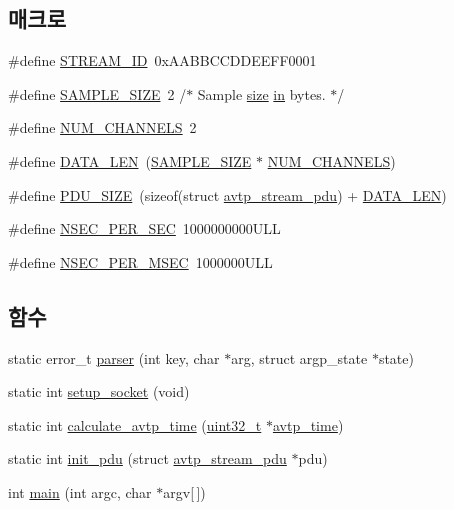 \subsection*{매크로}
\begin{DoxyCompactItemize}
\item 
\#define \hyperlink{aaf-talker_8c_ade86a80a3d067dece1f7e7cf957e3e92}{S\+T\+R\+E\+A\+M\+\_\+\+ID}~0x\+A\+A\+B\+B\+C\+C\+D\+D\+E\+E\+F\+F0001
\item 
\#define \hyperlink{aaf-talker_8c_ae25e0da7cdb20c758a56dc6aece92ba7}{S\+A\+M\+P\+L\+E\+\_\+\+S\+I\+ZE}~2 /$\ast$ Sample \hyperlink{gst__avb__playbin_8c_a439227feff9d7f55384e8780cfc2eb82}{size} \hyperlink{jack_8c_afc03a33132f7c0bcacbeeeaf5b8510c0}{in} bytes. $\ast$/
\item 
\#define \hyperlink{aaf-talker_8c_ae5597ce31d23d11493e6e674fe257d73}{N\+U\+M\+\_\+\+C\+H\+A\+N\+N\+E\+LS}~2
\item 
\#define \hyperlink{aaf-talker_8c_af02e45f15080b8ec9dd7b286157617ff}{D\+A\+T\+A\+\_\+\+L\+EN}~(\hyperlink{aaf-talker_8c_ae25e0da7cdb20c758a56dc6aece92ba7}{S\+A\+M\+P\+L\+E\+\_\+\+S\+I\+ZE} $\ast$ \hyperlink{aaf-talker_8c_ae5597ce31d23d11493e6e674fe257d73}{N\+U\+M\+\_\+\+C\+H\+A\+N\+N\+E\+LS})
\item 
\#define \hyperlink{aaf-talker_8c_a4bdc13655ee7bf4cf0e66d16e22dc103}{P\+D\+U\+\_\+\+S\+I\+ZE}~(sizeof(struct \hyperlink{structavtp__stream__pdu}{avtp\+\_\+stream\+\_\+pdu}) + \hyperlink{aaf-talker_8c_af02e45f15080b8ec9dd7b286157617ff}{D\+A\+T\+A\+\_\+\+L\+EN})
\item 
\#define \hyperlink{aaf-talker_8c_a0501e82515b2bdf36453c4cc80f5e0cc}{N\+S\+E\+C\+\_\+\+P\+E\+R\+\_\+\+S\+EC}~1000000000\+U\+LL
\item 
\#define \hyperlink{aaf-talker_8c_ad16e9029e202d2dfb4cfae8f09131f8f}{N\+S\+E\+C\+\_\+\+P\+E\+R\+\_\+\+M\+S\+EC}~1000000\+U\+LL
\end{DoxyCompactItemize}
\subsection*{함수}
\begin{DoxyCompactItemize}
\item 
static error\+\_\+t \hyperlink{aaf-talker_8c_aa4dfc09c5a09d2e347cd355dfdecba57}{parser} (int key, char $\ast$arg, struct argp\+\_\+state $\ast$state)
\item 
static int \hyperlink{aaf-talker_8c_aad31b1ae23d50a606d0b3cc45d346f4e}{setup\+\_\+socket} (void)
\item 
static int \hyperlink{aaf-talker_8c_a6427a0487655e0c6055f6660ce314709}{calculate\+\_\+avtp\+\_\+time} (\hyperlink{parse_8c_a6eb1e68cc391dd753bc8ce896dbb8315}{uint32\+\_\+t} $\ast$\hyperlink{avtp_8h_a81ec49d93f7a916531f4d97214f47515}{avtp\+\_\+time})
\item 
static int \hyperlink{aaf-talker_8c_af259dd94b2af738f7d96b177c1ab8ce2}{init\+\_\+pdu} (struct \hyperlink{structavtp__stream__pdu}{avtp\+\_\+stream\+\_\+pdu} $\ast$pdu)
\item 
int \hyperlink{aaf-talker_8c_a0ddf1224851353fc92bfbff6f499fa97}{main} (int argc, char $\ast$argv\mbox{[}$\,$\mbox{]})
\end{DoxyCompactItemize}
